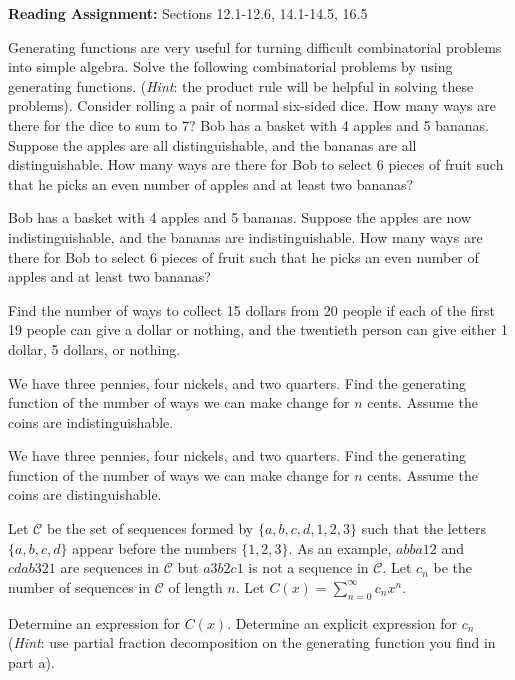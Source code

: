 \documentclass[12pt,twoside]{article}
\begin{document}

\noindent \textbf{Reading Assignment:}   Sections  12.1-12.6, 14.1-14.5, 16.5



\begin{problem}{30}
Generating functions are very useful for turning difficult combinatorial problems into simple algebra.  Solve the following combinatorial problems by using generating functions.
(\textit{Hint}: the product rule will be helpful in solving these problems).
\bparts
{}  Consider rolling a pair of normal six-sided dice.  How many ways are there for the dice to sum to 7?
  Bob has a basket with 4 apples and 5 bananas.  Suppose the apples are all distinguishable, and the bananas are all distinguishable.  How many ways are there for Bob to select 6 pieces of fruit such that he picks an even number of apples and at least two bananas?

   Bob has a basket with 4 apples and 5 bananas.  Suppose the apples are now indistinguishable, and the bananas are indistinguishable.  How many ways are there for Bob to select 6 pieces of fruit such that he picks an even number of apples and at least two bananas?

  Find the number of ways to collect 15 dollars from 20 people if each of the first 19 people can give a dollar or nothing, and the twentieth person can give either 1 dollar, 5 dollars, or nothing.

  We have three pennies, four nickels, and two quarters. Find the generating function of the number of ways we can make change for $n$ cents.  Assume the coins are indistinguishable.

 We have three pennies, four nickels, and two quarters. Find the generating function of the number of ways we can make change for $n$ cents.  Assume the coins are distinguishable.

\eparts

\end{problem}

\begin{problem}{10}
Let $\mathcal{C}$ be the set of sequences formed by $\{a, b, c, d, 1, 2, 3\}$ such that the letters $\{a, b, c, d\}$ appear before the numbers $\{1, 2, 3\}$.  As an example, $abba12$ and $cdab321$ are sequences in  $\mathcal{C}$ but $a3b2c1$ is not a sequence in  $\mathcal{C}$.  Let $c_n$ be the number of sequences in  $\mathcal{C}$ of length $n$.  Let $C(x) = \displaystyle\sum\limits_{n=0}^\infty c_n x^n$. 

\bparts
{} Determine an expression for $C(x)$.  
 Determine an explicit expression for $c_n$ (\textit{Hint}: use partial fraction decomposition on the generating function you find in part a).  
\eparts

\end{problem}
\end{document}
